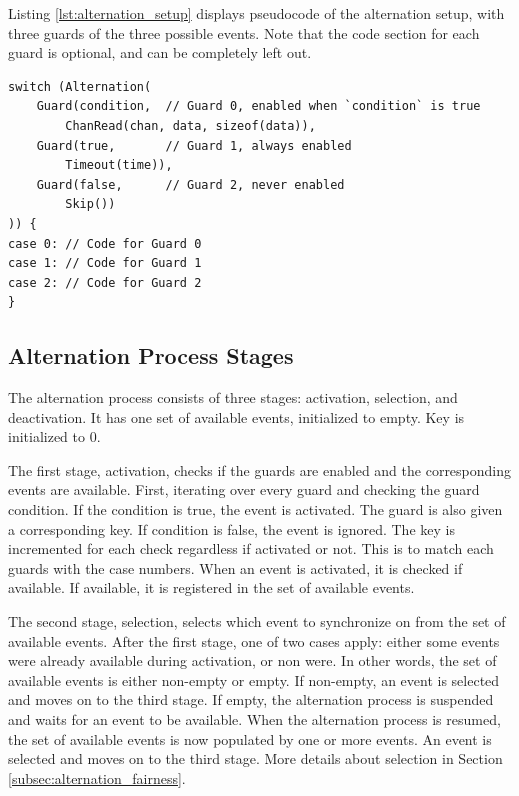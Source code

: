 Listing \ref{lst:alternation_setup} displays pseudocode of the alternation setup, with three guards of the three possible events. Note that the code section for each guard is optional, and can be completely left out.

\begin{lstlisting}[style=CustomC,caption={Pseudocode of alternation setup},label={lst:alternation_setup}]
switch (Alternation(
	Guard(condition,  // Guard 0, enabled when `condition` is true
		ChanRead(chan, data, sizeof(data)),
	Guard(true,       // Guard 1, always enabled
		Timeout(time)),
	Guard(false,      // Guard 2, never enabled
		Skip())
)) {
case 0: // Code for Guard 0
case 1: // Code for Guard 1
case 2: // Code for Guard 2
}
\end{lstlisting}

\subsection{Alternation Process Stages}
\label{subsec:alternation_process_stages}

The alternation process consists of three stages: activation, selection, and deactivation. It has one set of available events, initialized to empty. Key is initialized to 0.

The first stage, activation, checks if the guards are enabled and the corresponding events are available. First, iterating over every guard and checking the guard condition. If the condition is true, the event is activated. The guard is also given a corresponding key. If condition is false, the event is ignored. The key is incremented for each check regardless if activated or not. This is to match each guards with the case numbers. When an event is activated, it is checked if available. If available, it is registered in the set of available events.

The second stage, selection, selects which event to synchronize on from the set of available events. After the first stage, one of two cases apply: either some events were already available during activation, or non were. In other words, the set of available events is either non\hyp{}empty or empty. If non\hyp{}empty, an event is selected and moves on to the third stage. If empty, the alternation process is suspended and waits for an event to be available. When the alternation process is resumed, the set of available events is now populated by one or more events. An event is selected and moves on to the third stage. More details about selection in Section \ref{subsec:alternation_fairness}.

